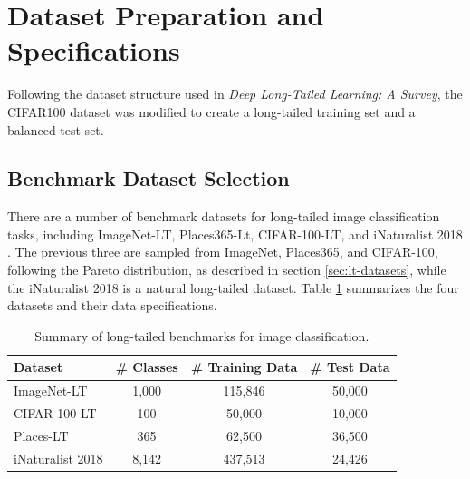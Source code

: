 \section{Dataset Preparation and Specifications}
\label{sec:dataset_specs}
Following the dataset structure used in \textit{Deep Long-Tailed Learning: A Survey}, the CIFAR100 dataset was modified to create a long-tailed training set and a balanced test set. 

\subsection{Benchmark Dataset Selection}
There are a number of benchmark datasets for long-tailed image classification tasks, including ImageNet-LT, Places365-Lt, CIFAR-100-LT, and iNaturalist 2018 . The previous three are sampled from ImageNet, Places365, and CIFAR-100, following the Pareto distribution, as described in section \ref{sec:lt-datasets}, while the iNaturalist 2018 is a natural long-tailed dataset. Table \ref{tab:datasets} summarizes the four datasets and their data specifications. 

\begin{table}[ht]
    \centering
    \caption{Summary of long-tailed benchmarks for image classification. }
    \begin{tabular}{lccc}
    \hline
    \textbf{Dataset}           & \textbf{\# Classes} & \textbf{\# Training Data} & \textbf{\# Test Data} \\ \hline
    ImageNet-LT   & 1,000              & 115,846                   & 50,000                \\
    CIFAR-100-LT   & 100                & 50,000                    & 10,000                \\
    Places-LT     & 365                & 62,500                    & 36,500                \\
    iNaturalist 2018 & 8,142            & 437,513                   & 24,426                \\ \hline
    \end{tabular}
    \label{tab:datasets}
\end{table}
    

